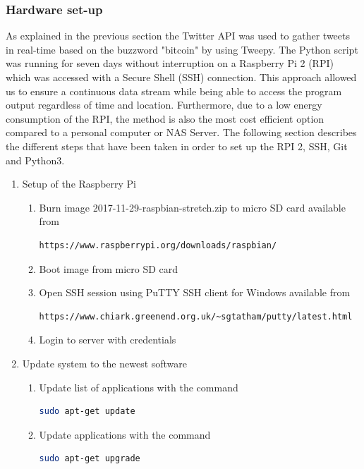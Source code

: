 \documentclass[a4paper,12pt]{article}
\begin{document}
\begin{spacing}{1.2}
\subsubsection{Hardware set-up}
As explained in the previous section the Twitter API was used to gather tweets in real-time based on the buzzword "bitcoin" by using Tweepy. The Python script was running for seven days without interruption on a Raspberry Pi 2 (RPI) which was accessed with a Secure Shell (SSH) connection. This approach allowed us to ensure a continuous data stream while being able to access the program output regardless of time and location. Furthermore, due to a low energy consumption of the RPI, the method is also the most cost efficient option compared to a personal computer or NAS Server. The following section describes the different steps that have been taken in order to set up the RPI 2, SSH, Git and Python3.\\

\begin{enumerate}

\item Setup of the Raspberry Pi
\begin{enumerate}
\item Burn image 2017-11-29-raspbian-stretch.zip to micro SD card available from
\begin{lstlisting}[language=bash]
https://www.raspberrypi.org/downloads/raspbian/
\end{lstlisting}
\item Boot image from micro SD card 
\item Open SSH session using PuTTY SSH client for Windows available from
\begin{lstlisting}[language=bash] 
https://www.chiark.greenend.org.uk/~sgtatham/putty/latest.html
\end{lstlisting}
\item Login to server with credentials 
\end{enumerate}

\item Update system to the newest software
\begin{enumerate}
\item Update list of applications with the command
\begin{lstlisting}[language=bash]
sudo apt-get update
\end{lstlisting}
\item Update applications with the command
\begin{lstlisting}[language=bash]
sudo apt-get upgrade
\end{lstlisting}
\end{enumerate}


\end{enumerate}
\end{spacing}
\end{document}
